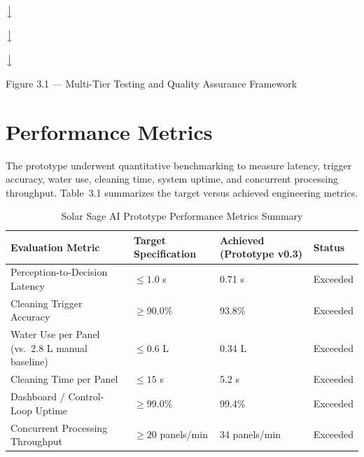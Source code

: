 \documentclass[12pt]{report}
\newcommand{\flowarrow}{\par\centering$\big\downarrow$\par}
\begin{document}
\begin{center}
\begin{minipage}{0.7\linewidth}
\centering
{}
\flowarrow
{}
\flowarrow
{}
\flowarrow
{}
\end{minipage}
\end{center}
\begin{center}
\small Figure 3.1 --- Multi-Tier Testing and Quality Assurance Framework
\end{center}

\section{Performance Metrics}

The prototype underwent quantitative benchmarking to measure latency, trigger accuracy, water use, cleaning time, system uptime, and concurrent processing throughput. Table~3.1 summarizes the target versus achieved engineering metrics.

\begin{table}[h]
\centering
\small
\begin{tabular}{@{}p{4.3cm}p{2.7cm}p{3.2cm}p{1.7cm}@{}}
\toprule
\textbf{Evaluation Metric} & \textbf{Target Specification} & \textbf{Achieved (Prototype v0.3)} & \textbf{Status} \\
\midrule
Perception-to-Decision Latency & $\leq 1.0$ s & 0.71 s & Exceeded \\
Cleaning Trigger Accuracy & $\geq 90.0\%$ & 93.8\% & Exceeded \\
Water Use per Panel (vs.\ 2.8 L manual baseline) & $\leq 0.6$ L & 0.34 L & Exceeded \\
Cleaning Time per Panel & $\leq 15$ s & 5.2 s & Exceeded \\
Dashboard / Control-Loop Uptime & $\geq 99.0\%$ & 99.4\% & Exceeded \\
Concurrent Processing Throughput & $\geq 20$ panels/min & 34 panels/min & Exceeded \\
\bottomrule
\end{tabular}
\caption{Solar Sage AI Prototype Performance Metrics Summary}
\end{table}
\end{document}
